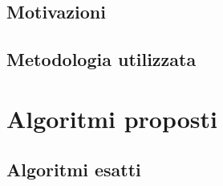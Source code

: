 \subsection{Motivazioni}
\label{sec:fasterMotivazioni}
% 
% 


\subsection{Metodologia utilizzata}
\label{sec:fasterMetodologia}

\section{Algoritmi proposti}
\label{sec:algoritmiProposti}


\subsection{Algoritmi esatti}
\label{sec:algoritmiEsatti}


